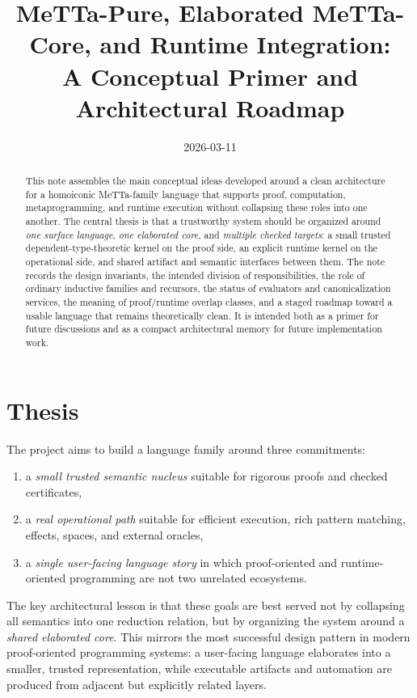 \documentclass[11pt]{article}
\title{MeTTa-Pure, Elaborated MeTTa-Core, and Runtime Integration:\\A Conceptual Primer and Architectural Roadmap}
\author{}
\date{2026-03-11}
\begin{document}
\maketitle

\begin{abstract}
This note assembles the main conceptual ideas developed around a clean architecture for a homoiconic MeTTa-family language that supports proof, computation, metaprogramming, and runtime execution without collapsing these roles into one another. The central thesis is that a trustworthy system should be organized around \emph{one surface language}, \emph{one elaborated core}, and \emph{multiple checked targets}: a small trusted dependent-type-theoretic kernel on the proof side, an explicit runtime kernel on the operational side, and shared artifact and semantic interfaces between them. The note records the design invariants, the intended division of responsibilities, the role of ordinary inductive families and recursors, the status of evaluators and canonicalization services, the meaning of proof/runtime overlap classes, and a staged roadmap toward a usable language that remains theoretically clean. It is intended both as a primer for future discussions and as a compact architectural memory for future implementation work.
\end{abstract}

\tableofcontents

\section{Thesis}
The project aims to build a language family around three commitments:
\begin{enumerate}[label=(\roman*)]
  \item a \emph{small trusted semantic nucleus} suitable for rigorous proofs and checked certificates,
  \item a \emph{real operational path} suitable for efficient execution, rich pattern matching, effects, spaces, and external oracles,
  \item a \emph{single user-facing language story} in which proof-oriented and runtime-oriented programming are not two unrelated ecosystems.
\end{enumerate}

The key architectural lesson is that these goals are best served not by collapsing all semantics into one reduction relation, but by organizing the system around a \emph{shared elaborated core}. This mirrors the most successful design pattern in modern proof-oriented programming systems: a user-facing language elaborates into a smaller, trusted representation, while executable artifacts and automation are produced from adjacent but explicitly related layers.
\end{document}
